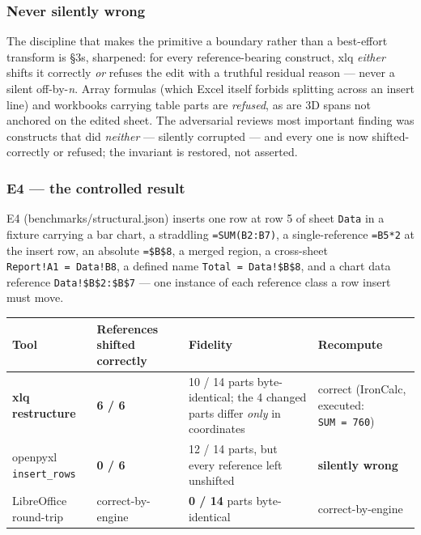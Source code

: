 \documentclass[
]{article}
\newcounter{none} %
\begin{document}
\subsubsection{Never silently wrong}\label{never-silently-wrong}

The discipline that makes the primitive a boundary rather than a
best-effort transform is §3\textquotesingle s, sharpened: for every
reference-bearing construct, xlq \emph{either} shifts it correctly
\emph{or} refuses the edit with a truthful residual reason --- never a
silent off-by-\emph{n}. Array formulas (which Excel itself forbids
splitting across an insert line) and workbooks carrying table parts are
\emph{refused}, as are 3D spans not anchored on the edited sheet. The
adversarial review\textquotesingle s most important finding was
constructs that did \emph{neither} --- silently corrupted --- and every
one is now shifted-correctly or refused; the invariant is restored, not
asserted.

\subsubsection{E4 --- the controlled
result}\label{e4--the-controlled-result}

E4 (benchmarks/structural.json) inserts one row at row 5 of sheet
\texttt{Data} in a fixture carrying a bar chart, a straddling
\texttt{=SUM(B2:B7)}, a single-reference \texttt{=B5*2} at the insert
row, an absolute \texttt{=\$B\$8}, a merged region, a cross-sheet
\texttt{Report!A1\ =\ Data!B8}, a defined name
\texttt{Total\ =\ Data!\$B\$8}, and a chart data reference
\texttt{Data!\$B\$2:\$B\$7} --- one instance of each reference class a
row insert must move.

{\def\LTcaptype{none} %
\begin{longtable}[]{@{}llll@{}}
\toprule\noalign{}
Tool & References shifted correctly & Fidelity & Recompute \\
\midrule\noalign{}
\endhead
\bottomrule\noalign{}
\endlastfoot
\textbf{xlq restructure} & \textbf{6 / 6} & 10 / 14 parts
byte-identical; the 4 changed parts differ \emph{only} in coordinates &
correct (IronCalc, executed: \texttt{SUM\ =\ 760}) \\
openpyxl \texttt{insert\_rows} & \textbf{0 / 6} & 12 / 14 parts, but
every reference left unshifted & \textbf{silently wrong} \\
LibreOffice round-trip & correct-by-engine & \textbf{0 / 14} parts
byte-identical & correct-by-engine \\
\end{longtable}
}
\end{document}
